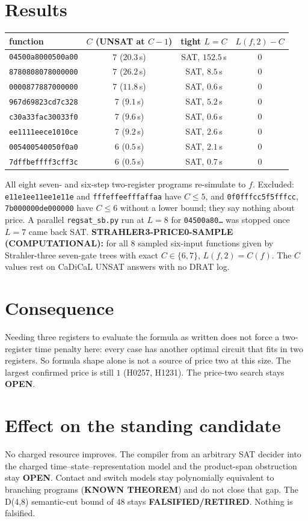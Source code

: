 \documentclass[11pt]{article}
\begin{document}
\section*{Results}
\begin{center}\small
\begin{tabular}{lccc}
function & $C$ (UNSAT at $C-1$) & tight $L=C$ & $L(f,2)-C$\\\hline
\texttt{04500a8000500a00} & $7$ ($20.3$\,s) & SAT, $152.5$\,s & $0$\\
\texttt{8780808078000000} & $7$ ($26.2$\,s) & SAT, $8.5$\,s & $0$\\
\texttt{0000877887000000} & $7$ ($11.8$\,s) & SAT, $0.6$\,s & $0$\\
\texttt{967d69823cd7c328} & $7$ ($9.1$\,s) & SAT, $5.2$\,s & $0$\\
\texttt{c30a33fac30033f0} & $7$ ($9.6$\,s) & SAT, $0.6$\,s & $0$\\
\texttt{ee1111eece1010ce} & $7$ ($9.2$\,s) & SAT, $2.6$\,s & $0$\\
\texttt{005400540050f0a0} & $6$ ($0.5$\,s) & SAT, $2.1$\,s & $0$\\
\texttt{7dffbeffff3cff3c} & $6$ ($0.5$\,s) & SAT, $0.7$\,s & $0$\\
\end{tabular}
\end{center}
All eight seven- and six-step two-register programs re-simulate to $f$. Excluded: \texttt{e11e1ee11ee1e11e} and \texttt{fffeffeefffaffaa} have $C\le5$, and \texttt{0f0fffcc5f5fffcc}, \texttt{7b000000de000000} have $C\le6$ without a lower bound; they say nothing about price. A parallel \texttt{regsat\_sb.py} run at $L=8$ for \texttt{04500a80\ldots} was stopped once $L=7$ came back SAT.
\textbf{STRAHLER3-PRICE0-SAMPLE (COMPUTATIONAL):} for all $8$ sampled six-input functions given by Strahler-three seven-gate trees with exact $C\in\{6,7\}$, $L(f,2)=C(f)$. The $C$ values rest on CaDiCaL UNSAT answers with no DRAT log.
\section*{Consequence}
Needing three registers to evaluate the formula as written does not force a two-register time penalty here: every case has another optimal circuit that fits in two registers. So formula shape alone is not a source of price two at this size. The largest confirmed price is still $1$ (H0257, H1231). The price-two search stays \textbf{OPEN}.
\section*{Effect on the standing candidate}
No charged resource improves. The compiler from an arbitrary SAT decider into the charged time--state--representation model and the product-span obstruction stay \textbf{OPEN}. Contact and switch models stay polynomially equivalent to branching programs (\textbf{KNOWN THEOREM}) and do not close that gap. The D(4,8) semantic-cut bound of $48$ stays \textbf{FALSIFIED/RETIRED}. Nothing is falsified.
\end{document}
